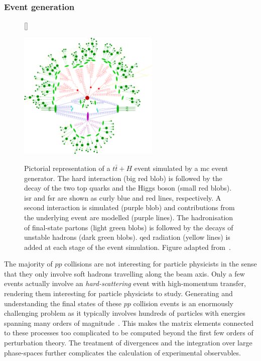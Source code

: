 \subsubsection{Event generation}


\begin{figure}
[\FBwidth]
{\caption{Pictorial representation of a $t\bar{t}+H$ event simulated by a \gls{mc} event generator. The hard interaction (big red blob) is followed by the decay of the two top quarks and the Higgs boson (small red blobs). \gls{isr} and \gls{fsr} are shown as curly blue and red lines, respectively. A second interaction is simulated (purple blob) and contributions from the underlying event are modelled (purple lines). The hadronisation of final-state partons (light green blobs) is followed by the decays of unstable hadrons (dark green blobs). \gls{qed} radiation (yellow lines) is added at each stage of the event simulation. Figure adapted from~\cite{Gleisberg:2008ta}.}\label{fig:sherpa_event}}
{\includegraphics[width=0.6\textwidth]{sherpa_event}}
\end{figure}


The majority of $pp$ collisions are not interesting for particle physicists in the sense that they only involve soft hadrons travelling along the beam axis. Only a few events actually involve an \textit{hard-scattering} event with high-momentum transfer, rendering them interesting for particle physicists to study. Generating and understanding the final states of these $pp$ collision events is an enormously challenging problem as it typically involves hundreds of particles with energies spanning many orders of magnitude~\cite{Buckley:2011ms}. This makes the matrix elements connected to these processes too complicated to be computed beyond the first few orders of perturbation theory. The treatment of divergences and the integration over large phase-spaces further complicates the calculation of experimental observables.

